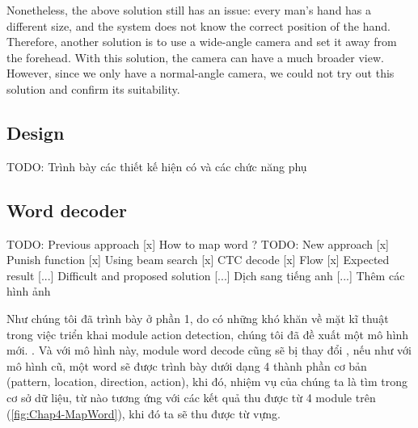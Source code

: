 Nonetheless, the above solution still has an issue: every man's hand has a different size, and the system does not know the correct position of the hand. Therefore, another solution is to use a wide-angle camera and set it away from the forehead. With this solution, the camera can have a much broader view. However, since we only have a normal-angle camera, we could not try out this solution and confirm its suitability.

\subsection{Design}
  TODO: Trình bày các thiết kế hiện có và các chức năng phụ

\subsection{Word decoder}
TODO:   Previous approach 
      [x] How to map word ?
TODO:   New approach
      [x] Punish function
      [x] Using beam search
      [x] CTC decode
      [x] Flow
      [x] Expected result
      [...] Difficult and proposed solution
      [...] Dịch sang tiếng anh
      [...] Thêm các hình ảnh



    Như chúng tôi đã trình bày ở phần 1, do có những khó khăn 
    về mặt kĩ thuật trong việc triển khai module
    action detection, chúng tôi đã đề xuất một mô hình mới.
    . Và với mô hình này, module word decode cũng sẽ bị thay đổi
    , nếu như với mô hình cũ, một word sẽ được trình bày dưới dạng
    4 thành phần cơ bản (pattern, location, direction, action),
    khi đó, nhiệm vụ của chúng ta là tìm trong cơ sở dữ liệu, từ nào
    tương ứng với các kết quả thu được từ 4 module trên (\ref{fig:Chap4-MapWord}), khi đó
    ta sẽ thu được từ vựng.


